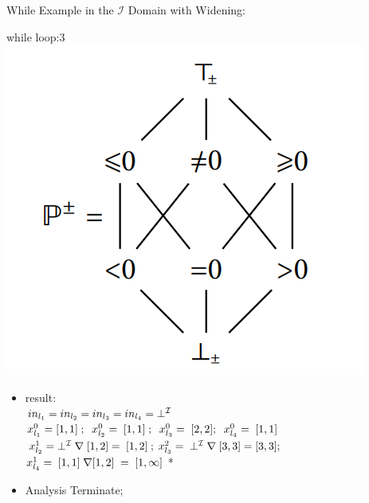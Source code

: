 \begin{frame}{While Example in the  $\mathcal{I}$ Domain with Widening:}
\begin{exampleblock}{while loop:3}
	\centering 
	\centering \includegraphics[scale=0.60]{content/images/static-analysis/sign1.png}
	\begin{itemize}
		\item result: 
		\\ $\scriptsize in_{l_1}=in_{l_2}=in_{l_3}=in_{l_4}=\bot^{\mathcal{I}}$
		\\ $\scriptsize x_{l_1}^0 = [1,1]~ ;~~x_{l_2}^0 =~[1,1]~;~~x_{l_3}^0 =~[2,2] ;~~x_{l_4}^0 =~[1,1]$
		\\ $\scriptsize x_{l_2}^1 = \bot^{\mathcal{I}}~ \nabla~[1,2] =~[1,2] ~; ~ x_{l_3}^2 =~\bot^{\mathcal{I}}~ \nabla~[3,3] = [3,3];$\\
		$\scriptsize x_{l_4}^1 =~ [1,1]~ \nabla[1,2]~= ~[1,\infty] $ *		
		\item Analysis Terminate;
	\end{itemize}
\end{exampleblock}
\end{frame}

